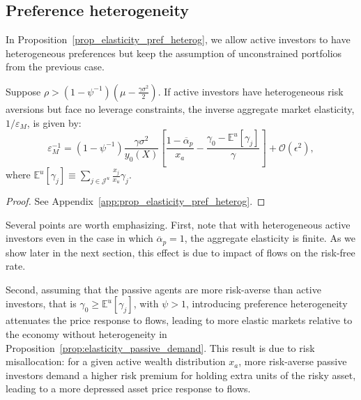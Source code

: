 \subsection{Preference heterogeneity}
In Proposition~\ref{prop_elasticity_pref_heterog}, we allow active investors to have heterogeneous preferences but keep the assumption of unconstrained portfolios from the previous case.
\begin{prop}\label{prop_elasticity_pref_heterog}
	Suppose $\rho>\left(1-\psi^{-1}\right)\left( \mu - \frac{\gamma\sigma^2}{2}  \right)$. If active investors have heterogeneous risk aversions but face no leverage constraints, the inverse aggregate market elasticity, $ 1/\varepsilon_M $, is given by:
	\begin{equation}\label{eq:elasticity_pref_heterog}
	\varepsilon_M^{-1}=\left(1-\psi^{-1}\right) \frac{\gamma \sigma^{2}}{y_{0}(X)}\left[\frac{1-\overline{\alpha}_{p}}{x_{a}}-\frac{\gamma_{0}-\mathbb{E}^{u}[\gamma_{j}]}{\gamma}\right]+\mathcal{O}\left(\epsilon^{2}\right),
	\end{equation}
	where $ \mathbb{E}^u[ \gamma_j] \equiv\sum_{j\in\mathcal{J}^u} \frac{x_j}{x_u} \gamma_j.$
\end{prop}
\begin{proof}
	See Appendix~\ref{app:prop_elasticity_pref_heterog}.
\end{proof}

Several points are worth emphasizing. First, note that with heterogeneous active investors even in the case in which $ \overline{\alpha}_p=1 $, the aggregate elasticity is finite. As we show later in the next section, this effect is due to impact of flows on the risk-free rate. %

Second, assuming that the passive agents are more risk-averse than active investors, that is $ \gamma_{0}\ge\mathbb{E}^{u}[\gamma_{j}] $, with $ \psi>1 $, introducing preference heterogeneity attenuates the price response to flows, leading to more elastic markets relative to the economy without heterogeneity in Proposition~\ref{prop:elasticity_passive_demand}. This result is due to risk misallocation: for a given active wealth distribution $ x_a $, more risk-averse passive investors demand a higher risk premium for holding extra units of the risky asset, leading to a more depressed asset price response to flows.

